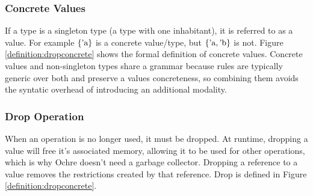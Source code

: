 \documentclass[12pt,twoside]{report}
\begin{document}
\subsubsection{Concrete Values}
If a type is a singleton type (a type with one inhabitant), it is referred to as a value. For example $\{ \text{'a} \}$ is a concrete value/type, but $\{ \text{'a}, \text{'b} \}$ is not. Figure \ref{definition:dropconcrete} shows the formal definition of concrete values. Concrete values and non-singleton types share a grammar because rules are typically generic over both and preserve a values concreteness, so combining them avoids the syntatic overhead of introducing an additional modality.

\subsubsection{Drop Operation}
When an operation is no longer used, it must be dropped. At runtime, dropping a value will free it's associated memory, allowing it to be used for other operations, which is why Ochre doesn't need a garbage collector. Dropping a reference to a value removes the restrictions created by that reference. Drop is defined in Figure \ref{definition:dropconcrete}.
\end{document}
